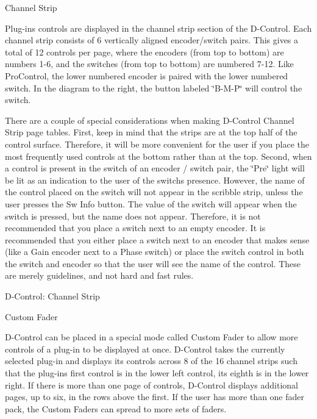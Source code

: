 \begin{DoxyItemize}
\item Channel Strip

Plug-\/ins\textquotesingle{} controls are displayed in the channel strip section of the D-\/\+Control. Each channel strip consists of 6 vertically aligned encoder/switch pairs. This gives a total of 12 controls per page, where the encoders (from top to bottom) are numbers 1-\/6, and the switches (from top to bottom) are numbered 7-\/12. Like Pro\+Control, the lower numbered encoder is paired with the lower numbered switch. In the diagram to the right, the button labeled \char`\"{}\+B-\/\+M-\/\+P\char`\"{} will control the switch.

There are a couple of special considerations when making D-\/\+Control Channel Strip page tables. First, keep in mind that the strips are at the top half of the control surface. Therefore, it will be more convenient for the user if you place the most frequently used controls at the bottom rather than at the top. Second, when a control is present in the switch of an encoder / switch pair, the \char`\"{}\+Pre\char`\"{} light will be lit as an indication to the user of the switch\textquotesingle{}s presence. However, the name of the control placed on the switch will not appear in the scribble strip, unless the user presses the Sw Info button. The value of the switch will appear when the switch is pressed, but the name does not appear. Therefore, it is not recommended that you place a switch next to an empty encoder. It is recommended that you either place a switch next to an encoder that makes sense (like a Gain encoder next to a Phase switch) or place the switch control in both the switch and encoder so that the user will see the name of the control. These are merely guidelines, and not hard and fast rules.

  D-\/\+Control\+: Channel Strip  


\item Custom Fader

D-\/\+Control can be placed in a special mode called Custom Fader to allow more controls of a plug-\/in to be displayed at once. D-\/\+Control takes the currently selected plug-\/in and displays its controls across 8 of the 16 channel strips such that the plug-\/in\textquotesingle{}s first control is in the lower left control, its eighth is in the lower right. If there is more than one page of controls, D-\/\+Control displays additional pages, up to six, in the rows above the first. If the user has more than one fader pack, the Custom Faders can spread to more sets of faders.


\end{DoxyItemize}

